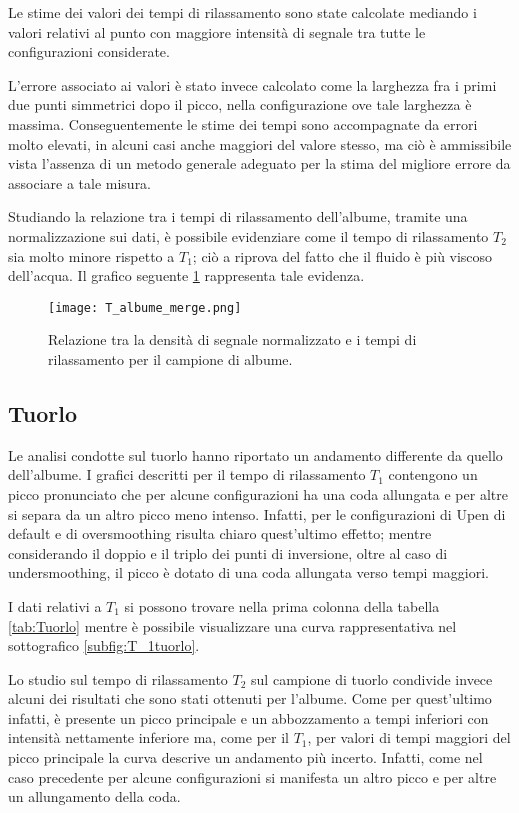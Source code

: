 Le stime dei valori dei tempi di rilassamento sono state calcolate mediando i valori relativi al punto con maggiore intensità di segnale tra tutte le configurazioni considerate.

L'errore associato ai valori è stato invece calcolato come la larghezza fra i primi due punti simmetrici dopo il picco, nella configurazione ove tale larghezza è massima.
Conseguentemente le stime dei tempi sono accompagnate da errori molto elevati, in alcuni casi anche maggiori del valore stesso, ma ciò è ammissibile vista l'assenza di un metodo generale adeguato per la stima del migliore errore da associare a tale misura.

Studiando la relazione tra i tempi di rilassamento dell'albume, tramite una normalizzazione sui dati, è possibile evidenziare come il tempo di rilassamento $T_2$ sia molto minore rispetto a $T_1$;
ciò a riprova del fatto che il fluido è più viscoso dell'acqua.   
Il grafico seguente \ref{fig:Albume} rappresenta tale evidenza.

\begin{figure}[h]
\centering
\texttt{[image: T\_albume\_merge.png]}
\caption{Relazione tra la densità di segnale normalizzato e i tempi di rilassamento per il campione di albume.}
\label{fig:Albume}
\end{figure}




\subsection*{Tuorlo}

Le analisi condotte sul tuorlo hanno riportato un andamento differente da quello dell'albume.
I grafici descritti per il tempo di rilassamento $T_1$ contengono un picco pronunciato che per alcune configurazioni ha una coda allungata e per altre si separa da un altro picco meno intenso.
Infatti, per le configurazioni di Upen di default e di oversmoothing risulta chiaro quest'ultimo effetto; mentre considerando il doppio e il triplo dei punti di inversione, oltre al caso di undersmoothing, il picco è dotato di una coda allungata verso tempi maggiori.

I dati relativi a $T_1$ si possono trovare nella prima colonna della tabella \ref{tab:Tuorlo} mentre è possibile visualizzare una curva rappresentativa nel sottografico \ref{subfig:T_1tuorlo}. 

Lo studio sul tempo di rilassamento $T_2$ sul campione di tuorlo condivide invece alcuni dei risultati che sono stati ottenuti per l'albume. 
Come per quest'ultimo infatti, è presente un picco principale e un abbozzamento a tempi inferiori con intensità nettamente inferiore ma, come per il $T_1$, per valori di tempi maggiori del picco principale la curva descrive un andamento più incerto.
Infatti, come nel caso precedente per alcune configurazioni si manifesta un altro picco e per altre un allungamento della coda.

